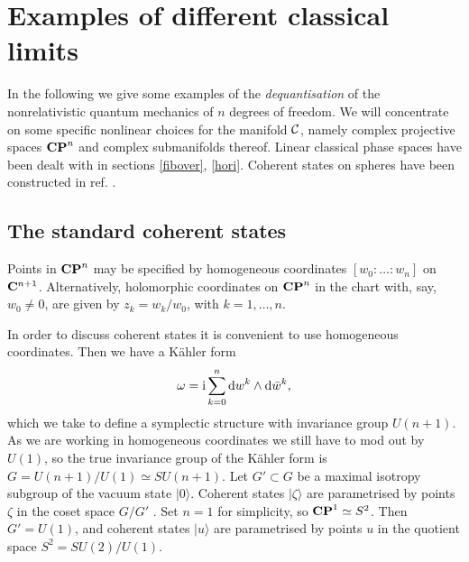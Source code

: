 \documentclass[a4paper,a4paper]{article}
\begin{document}
\section{Examples of different classical limits}\label{exam}

In the following we give some examples of the {\it dequantisation} 
of the nonrelativistic quantum mechanics of $n$ degrees of freedom. We will 
concentrate on some specific nonlinear choices for the manifold ${\cal C}$, 
namely  complex projective spaces ${\bf CP}^n$ and complex submanifolds 
thereof. Linear classical phase spaces have been dealt with in sections 
\ref{fibover}, \ref{hori}. Coherent states on spheres have been constructed 
in ref. \cite{SPHERES}.

\subsection{The standard coherent states}\label{stan}

Points in ${\bf CP}^n$ may be specified by homogeneous coordinates 
$[w_0:\ldots:w_n]$ on ${\bf C}^{n+1}$. Alternatively, holomorphic coordinates 
on ${\bf CP}^n$ in the chart with, say, $w_0\neq 0$, are given by $z_k=w_k/w_0$, 
with $k=1,\ldots,n$. 

In order to discuss coherent states it is convenient to use homogeneous coordinates.
Then we have a K\"ahler form
\begin{equation}
\omega={\rm i}\sum_{k=0}^n{\rm d} w^k\wedge {\rm d}\bar w^k,
\label{kahfor}
\end{equation}
which we take to define a symplectic structure with invariance group $U(n+1)$. 
As we are working in homogeneous coordinates we still have to mod out by $U(1)$, 
so the true invariance group of the K\"ahler form is $G=U(n+1)/U(1)\simeq SU(n+1)$.
Let $G'\subset G$ be a maximal isotropy subgroup \cite{PERELOMOV} of the vacuum state $|0\rangle $. 
Coherent states $|\zeta\rangle $ are parametrised by points $\zeta$ in the coset space $G/G'$
\cite{PERELOMOV}. Set $n=1$ for simplicity, so ${\bf CP}^1\simeq S^2$.
Then $G'=U(1)$, and coherent states $|u\rangle$ are parametrised by points $u$ 
in the quotient space $S^2=SU(2)/U(1)$.
 
\end{document}
